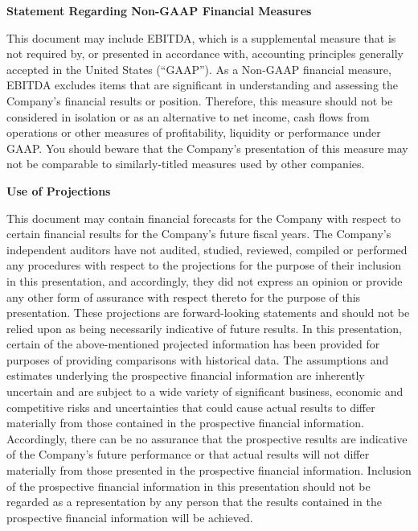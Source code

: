 \textbf{Statement Regarding Non-GAAP Financial Measures}\par\nobreak
This document may include EBITDA, which is a supplemental measure that is not required by, or presented in accordance with, accounting principles generally accepted in the United States (``GAAP''). As a Non-GAAP financial measure, EBITDA excludes items that are significant in understanding and assessing the Company's financial results or position. Therefore, this measure should not be considered in isolation or as an alternative to net income, cash flows from operations or other measures of profitability, liquidity or performance under GAAP. You should beware that the Company's presentation of this measure may not be comparable to similarly-titled measures used by other companies.\par
\bigskip

\textbf{Use of Projections}\par\nobreak
This document may contain financial forecasts for the Company with respect to certain financial results for the Company's future fiscal years. The Company's independent auditors have not audited, studied, reviewed, compiled or performed any procedures with respect to the projections for the purpose of their inclusion in this presentation, and accordingly, they did not express an opinion or provide any other form of assurance with respect thereto for the purpose of this presentation. These projections are forward-looking statements and should not be relied upon as being necessarily indicative of future results. In this presentation, certain of the above-mentioned projected information has been provided for purposes of providing comparisons with historical data. The assumptions and estimates underlying the prospective financial information are inherently uncertain and are subject to a wide variety of significant business, economic and competitive risks and uncertainties that could cause actual results to differ materially from those contained in the prospective financial information. Accordingly, there can be no assurance that the prospective results are indicative of the Company's future performance or that actual results will not differ materially from those presented in the prospective financial information. Inclusion of the prospective financial information in this presentation should not be regarded as a representation by any person that the results contained in the prospective financial information will be achieved.\par
\bigskip

